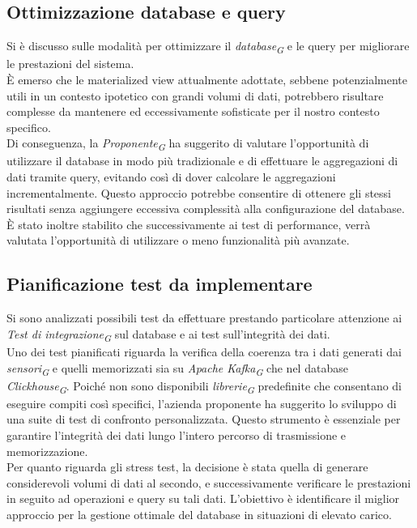 \documentclass{article}
\begin{document}
    \subsection{Ottimizzazione database e query}
    Si è discusso sulle modalità per ottimizzare il \textit{database}\textsubscript{\textit{G}} e le query per migliorare le prestazioni del sistema. \\
    È emerso che le materialized view attualmente adottate, sebbene potenzialmente utili in un contesto ipotetico con grandi volumi di dati, potrebbero risultare complesse da mantenere ed eccessivamente sofisticate per il nostro contesto specifico. \\
    Di conseguenza, la \textit{Proponente}\textsubscript{\textit{G}} ha suggerito di valutare l'opportunità di utilizzare il database in modo più tradizionale e di effettuare le aggregazioni di dati tramite query, evitando così di dover calcolare le aggregazioni incrementalmente. Questo approccio potrebbe consentire di ottenere gli stessi risultati senza aggiungere eccessiva complessità alla configurazione del database. È stato inoltre stabilito che successivamente ai test di performance, verrà valutata l’opportunità di utilizzare o meno
    funzionalità più avanzate.
    \subsection{Pianificazione test da implementare}
    Si sono analizzati possibili test da effettuare prestando particolare attenzione ai \textit{Test di integrazione}\textsubscript{\textit{G}} sul database e ai test sull'integrità dei dati. \\
    Uno dei test pianificati riguarda la verifica della coerenza tra i dati generati dai \textit{sensori}\textsubscript{\textit{G}} e quelli memorizzati sia su \textit{Apache Kafka}\textsubscript{\textit{G}} che nel database \textit{Clickhouse}\textsubscript{\textit{G}}. Poiché non sono disponibili \textit{librerie}\textsubscript{\textit{G}} predefinite che consentano di eseguire compiti così specifici, l'azienda proponente ha suggerito lo sviluppo di una suite di test di confronto personalizzata. Questo strumento è essenziale per garantire l'integrità dei dati lungo l'intero percorso di trasmissione e memorizzazione.\\
    Per quanto riguarda gli stress test, la decisione è stata quella di generare considerevoli volumi di dati al secondo, e successivamente verificare le prestazioni in seguito ad operazioni e query su tali dati. L'obiettivo è identificare il miglior approccio per la gestione ottimale del database in situazioni di elevato carico. 
\end{document}
